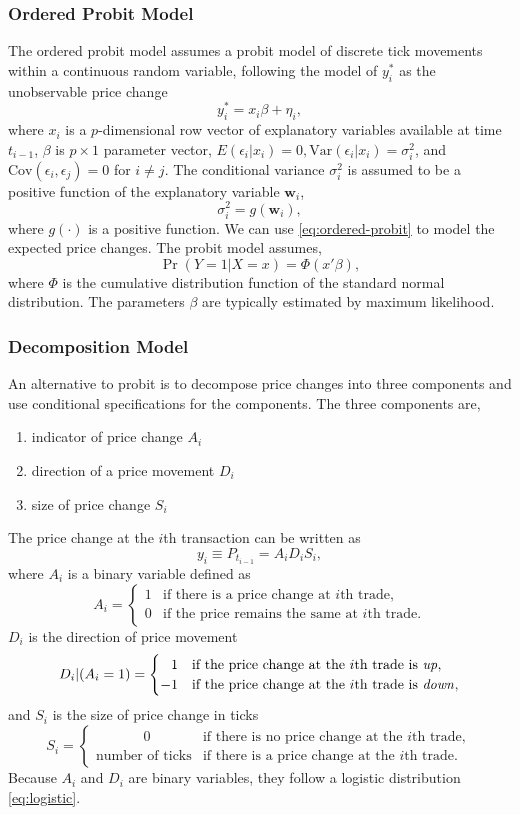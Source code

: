 \subsubsection{Ordered Probit Model}
The ordered probit model assumes a probit model of discrete tick movements within a continuous random variable, following the model of $y^*_i$ as the unobservable price change
\begin{equation}
y^*_i =x_i \beta +\eta_i,
\label{eq:ordered-probit}
\end{equation}
where $x_i$ is a $p$-dimensional row vector of explanatory variables available at time $t_{i-1}$, $\beta$ is $p \times 1$ parameter vector, $E(\epsilon_i | x_i)=0, \text{Var}(\epsilon_i | x_i)=\sigma^2_i$, and $\text{Cov}(\epsilon_i, \epsilon_j)=0$ for $i \ne j$. The conditional variance $\sigma^2_i$ is assumed to be a positive function of the explanatory variable $\mathbf{w}_i$,
\[
\sigma^2_i = g(\mathbf{w}_i),
\]
where $g(\cdot)$ is a positive function. We can use \eqref{eq:ordered-probit} to model the expected price changes. The probit model assumes,
\[
 \Pr(Y=1|X=x) = \Phi(x'\beta),
\]
where $\Phi$ is the cumulative distribution function of the standard normal distribution. The parameters $\beta$ are typically estimated by maximum likelihood.


\subsubsection{Decomposition Model}
An alternative to probit is to decompose price changes into three components and use conditional specifications for the components. The three components are,
\begin{enumerate}
\item indicator of price change $A_i$
\item direction of a price movement $D_i$
\item size of price change $S_i$
\end{enumerate}
The price change at the $i$th transaction can be written as
\[
y_i \equiv P_{t_{i-1}} = A_i D_i S_i,
\]
where $A_i$ is a binary variable defined as
\[
A_i =
\begin{cases}
	1 & \text{if there is a price change at $i$th trade},\\
	0 & \text{if the price remains the same at $i$th trade}.
\end{cases}
\]
$D_i$ is the direction of price movement
\[
D_i|(A_i=1) =
\begin{cases}
	\phantom{-}1  & \text{if the price change at the $i$th trade is \emph{up}},\\
	-1 & \text{if the price change at the $i$th trade is \emph{down}},
\end{cases}
\]
and $S_i$ is the size of price change in ticks
\[
S_i =
\begin{cases}
	\phantom{number}0 & \text{if there is no price change at the $i$th trade}, \\
	\text{number of ticks} & \text{if there is a price change at the $i$th trade}.
\end{cases}
\]
Because $A_i$ and $D_i$ are binary variables, they follow a logistic distribution \eqref{eq:logistic}.

